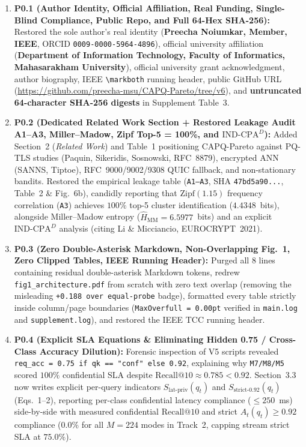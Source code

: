 \documentclass[10pt]{article}
\begin{document}
\begin{enumerate}
    \item \textbf{P0.1 (Author Identity, Official Affiliation, Real Funding, Single-Blind Compliance, Public Repo, and Full 64-Hex SHA-256):} Restored the sole author's real identity (\textbf{Preecha Noiumkar, Member, IEEE}, ORCID \texttt{0009-0000-5964-4896}), official university affiliation (\textbf{Department of Information Technology, Faculty of Informatics, Mahasarakham University}), official university grant acknowledgment, author biography, IEEE \texttt{\textbackslash markboth} running header, public GitHub URL (\url{https://github.com/preecha-msu/CAPQ-Pareto/tree/v6}), and \textbf{untruncated 64-character SHA-256 digests} in Supplement Table~3.
    \item \textbf{P0.2 (Dedicated Related Work Section + Restored Leakage Audit A1--A3, Miller--Madow, Zipf Top-5 = 100\%, and $\text{IND-CPA}^D$):} Added Section~2 (\emph{Related Work}) and Table~1 positioning CAPQ-Pareto against PQ-TLS studies (Paquin, Sikeridis, Sosnowski, RFC~8879), encrypted ANN (SANNS, Tiptoe), RFC~9000/9002/9308 QUIC fallback, and non-stationary bandits. Restored the empirical leakage table (\texttt{A1--A3}, SHA \texttt{47bd5a90...}, Table~2 \& Fig.~6b), candidly reporting that $\mathrm{Zipf}(1.15)$ frequency correlation (\texttt{A3}) achieves $100\%$ top-5 cluster identification ($4.4348$~bits), alongside Miller--Madow entropy ($\hat{H}_{\text{MM}}=6.5977$~bits) and an explicit $\text{IND-CPA}^D$ analysis (citing Li \& Micciancio, EUROCRYPT~2021).
    \item \textbf{P0.3 (Zero Double-Asterisk Markdown, Non-Overlapping Fig.~1, Zero Clipped Tables, IEEE Running Header):} Purged all 8 lines containing residual double-asterisk Markdown tokens, redrew \nolinkurl{fig1_architecture.pdf} from scratch with zero text overlap (removing the misleading \texttt{+0.188 over equal-probe} badge), formatted every table strictly inside column/page boundaries (\texttt{MaxOverfull = 0.00pt} verified in \texttt{main.log} and \texttt{supplement.log}), and restored the IEEE TCC running header.
    \item \textbf{P0.4 (Explicit SLA Equations \& Eliminating Hidden 0.75 / Cross-Class Accuracy Dilution):} Forensic inspection of V5 scripts revealed \texttt{req\_acc = 0.75 if qk == "conf" else 0.92}, explaining why \texttt{M7/M8/M5} scored $100\%$ confidential SLA despite $\mathrm{Recall}@10 \approx 0.785 < 0.92$. Section~3.3 now writes explicit per-query indicators $S_{\text{lat-priv}}(q_t)$ and $S_{\text{strict-0.92}}(q_t)$ (Eqs.~1--2), reporting per-class confidential latency compliance ($\le 250$~ms) side-by-side with measured confidential $\mathrm{Recall}@10$ and strict $A_t(q_t) \ge 0.92$ compliance ($0.0\%$ for all $M=224$ modes in Track~2, capping stream strict SLA at $75.0\%$).

\end{enumerate}
\end{document}
